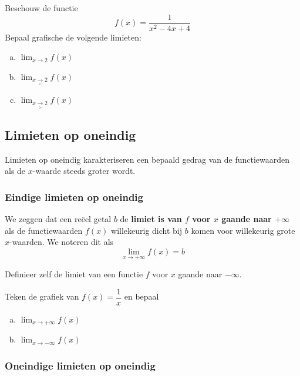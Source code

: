 \documentclass[12pt,twoside,a4paper]{article}
\newenvironment{definitie}
{
  \vspace{0.4cm}
  \begin{mdframed}[nobreak=true,frametitle={Definitie}]
  }{%
  \end{mdframed}
}
\begin{document}
\begin{oefening}
Beschouw de functie
$$f(x)=\dfrac{1}{x^2-4x+4}$$
Bepaal grafische de volgende limieten:
\begin{enumerate}[(a)]
  \itemsep.5em
  \item $\displaystyle\lim_{x\to 2} f(x)$
  \item $\displaystyle\lim_{x\underset{<}{\to} 2} f(x)$
  \item $\displaystyle\lim_{x\underset{>}{\to} 2} f(x)$
\end{enumerate}
\end{oefening}

\subsection{Limieten op oneindig}

Limieten op oneindig karakteriseren een bepaald gedrag van de functiewaarden als de $x$-waarde steeds groter wordt.

\subsubsection*{Eindige limieten op oneindig}

\begin{definitie}
  We zeggen dat een reëel getal $b$ de {\bf limiet is van $f$ voor $x$ gaande naar $+\infty$} als de functiewaarden $f(x)$ willekeurig dicht bij $b$ komen voor willekeurig grote $x$-waarden. We noteren dit als
  $$\lim_{x\to +\infty} f(x)=b$$
\end{definitie}

\begin{oefening}
  Definieer zelf de limiet van een functie $f$ voor $x$ gaande naar $-\infty$.
\end{oefening}

\begin{oefening}
  Teken de grafiek van $f(x)=\dfrac{1}{x}$ en bepaal
  \begin{enumerate}[(a)]
  \itemsep.5em
  \item $\displaystyle \lim_{x\to +\infty} f(x)$
  \item $\displaystyle \lim_{x\to -\infty} f(x)$
  \end{enumerate}
\end{oefening}

\subsubsection*{Oneindige limieten op oneindig}
\end{document}
